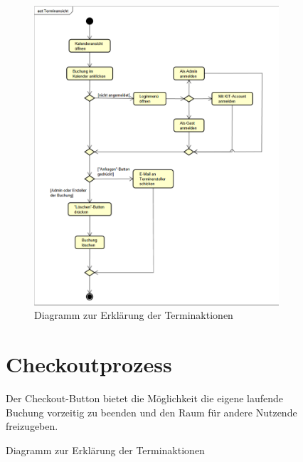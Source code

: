 \begin{figure}[ht]
\begin{figure}[ht]
    \centering
    \includegraphics[width=\textwidth]{figures/activity/terminansicht}
    \caption{Diagramm zur Erklärung der Terminaktionen}
    \label{fig:booking-actions-diagram}
\end{figure}
\clearpage

\section{Checkoutprozess}

Der Checkout-Button bietet die Möglichkeit die eigene laufende Buchung vorzeitig zu beenden und den Raum für andere Nutzende freizugeben.


\end{figure}
